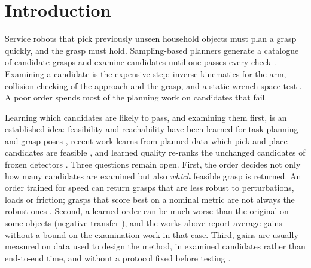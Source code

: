 \documentclass[pdflatex,sn-mathphys-num,iicol]{sn-jnl}
\begin{document}
\maketitle

\section{Introduction}\label{sec:intro}

Service robots that pick previously unseen household objects must plan a grasp quickly, and the grasp must hold. Sampling-based planners generate a catalogue of candidate grasps and examine candidates until one passes every check \cite{bohg2014survey,newbury2023review}. Examining a candidate is the expensive step: inverse kinematics for the arm, collision checking of the approach and the grasp, and a static wrench-space test \cite{ferrari1992planning}. A poor order spends most of the planning work on candidates that fail.

Learning which candidates are likely to pass, and examining them first, is an established idea: feasibility and reachability have been learned for task planning and grasp poses \cite{wells2019feasibility,lou2020reachability,akinola2021dynamic,jiang2022suction}, recent work learns from planned data which pick-and-place candidates are feasible \cite{qin2026planned,liu2025placement}, and learned quality re-ranks the unchanged candidates of frozen detectors \cite{yuan2026grare}. Three questions remain open. First, the order decides not only how many candidates are examined but also \emph{which} feasible grasp is returned. An order trained for speed can return grasps that are less robust to perturbations, loads or friction; grasps that score best on a nominal metric are not always the robust ones \cite{weisz2012pose,enwerem2026firmgrasp}. Second, a learned order can be much worse than the original on some objects (negative transfer \cite{wang2019negative}), and the works above report average gains without a bound on the examination work in that case. Third, gains are usually measured on data used to design the method, in examined candidates rather than end-to-end time, and without a protocol fixed before testing \cite{kressgazit2024empirical}.
\end{document}
